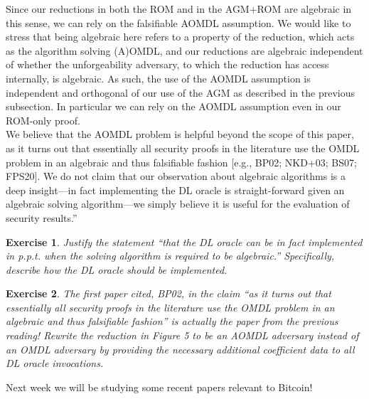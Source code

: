 \documentclass[12pt]{article}
\newtheorem{exercise}{Exercise}
\theoremstyle{definition}
\theoremstyle{remark}
\theoremstyle{definition}
\begin{document}
Since our reductions in both the ROM and in the AGM+ROM are algebraic in this sense, we can rely on the falsifiable AOMDL assumption. We would like to stress that being algebraic here refers to a property of the reduction, which acts as the algorithm solving (A)OMDL, and our reductions are algebraic independent of whether the unforgeability adversary, to which the reduction has access internally, is algebraic. As such, the use of the AOMDL assumption is independent and orthogonal of our use of the AGM as described in the previous subsection. In particular we can rely on the AOMDL assumption even in our ROM-only proof.\\

We believe that the AOMDL problem is helpful beyond the scope of this paper, as it turns out that essentially all security proofs in the literature use the OMDL problem in an algebraic and thus falsifiable fashion [e.g., BP02; NKD+03; BS07; FPS20]. We do not claim that our observation about algebraic algorithms is a deep insight---in fact implementing the DL oracle is straight-forward given an algebraic solving algorithm---we simply believe it is useful for the evaluation of security results.''

\begin{exercise}
Justify the statement ``that the DL oracle can be in fact implemented in p.p.t. when the solving algorithm is required to be algebraic.'' Specifically, describe how the DL oracle should be implemented.
\end{exercise}

\begin{exercise}
The first paper cited, BP02, in the claim ``as it turns out that essentially all security proofs in the literature use the OMDL problem in an algebraic and thus falsifiable fashion'' is actually the paper from the previous reading! Rewrite the reduction in Figure 5 to be an AOMDL adversary instead of an OMDL adversary by providing the necessary additional coefficient data to all DL oracle invocations.
\end{exercise}

Next week we will be studying some recent papers relevant to Bitcoin!
\end{document}
